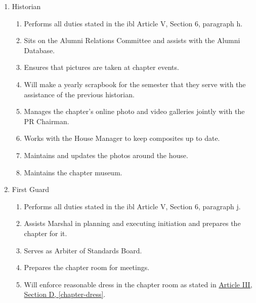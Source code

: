 \begin{enumerate}
		\item Historian
			\begin{enumerate}
				\item Performs all duties stated in the \gls{ibl} Article V, Section 6, paragraph h.
				\item Sits on the Alumni Relations Committee and assists with the Alumni Database.
				\item Ensures that pictures are taken at chapter events.
				\item Will make a yearly scrapbook for the semester that they serve with the assistance of the previous historian.
				\item Manages the chapter's online photo and video galleries jointly with the PR Chairman.
				\item Works with the House Manager to keep composites up to date.
				\item Maintains and updates the photos around the house.
				\item Maintains the chapter museum.
			\end{enumerate}


		\item First Guard
			\begin{enumerate}
				\item Performs all duties stated in the \gls{ibl} Article V, Section 6, paragraph j.
				\item Assists Marshal in planning and executing initiation and prepares the chapter for it.
				\item Serves as Arbiter of Standards Board.
				\item Prepares the chapter room for meetings.
				\item Will enforce reasonable dress in the chapter room as stated in \hyperref[chapter-dress]{Article III, Section D, \autoref*{chapter-dress}}.
			\end{enumerate}


\end{enumerate}
